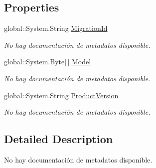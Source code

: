 \subsection*{Properties}
\begin{DoxyCompactItemize}
\item 
global\-::\-System.\-String \hyperlink{class_game_memory_1_1_c_____migration_history_aa3b7056950a36d9f1beec90a885528d6}{Migration\-Id}
\begin{DoxyCompactList}\small\item\em No hay documentación de metadatos disponible. \end{DoxyCompactList}\item 
global\-::\-System.\-Byte\mbox{[}$\,$\mbox{]} \hyperlink{class_game_memory_1_1_c_____migration_history_a58891e2fdcbaa080ac0552ececafc6e9}{Model}
\begin{DoxyCompactList}\small\item\em No hay documentación de metadatos disponible. \end{DoxyCompactList}\item 
global\-::\-System.\-String \hyperlink{class_game_memory_1_1_c_____migration_history_a0ed9c308a2f2cb884bf4ed841e400093}{Product\-Version}
\begin{DoxyCompactList}\small\item\em No hay documentación de metadatos disponible. \end{DoxyCompactList}\end{DoxyCompactItemize}


\subsection{Detailed Description}
No hay documentación de metadatos disponible. 



